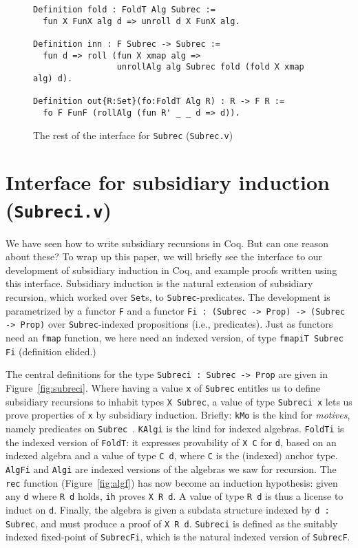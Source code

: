 \documentclass[a4paper,USenglish]{lipics-v2021}
\begin{document}
\begin{figure}
\begin{verbatim}
Definition fold : FoldT Alg Subrec :=
  fun X FunX alg d => unroll d X FunX alg.

Definition inn : F Subrec -> Subrec :=
  fun d => roll (fun X xmap alg =>
                 unrollAlg alg Subrec fold (fold X xmap alg) d).

Definition out{R:Set}(fo:FoldT Alg R) : R -> F R :=
  fo F FunF (rollAlg (fun R' _ _ d => d)).
\end{verbatim}
\caption{The rest of the interface for \texttt{Subrec} (\texttt{Subrec.v})}
\label{fig:subrecb}
\end{figure}


\section{Interface for subsidiary induction (\texttt{Subreci.v})}
\label{sec:interfacei}

We have seen how to write subsidiary recursions in Coq.  But can one
reason about these?  To wrap up this paper, we will briefly see the
interface to our development of subsidiary induction in Coq, and
example proofs written using this interface.  Subsidiary induction is
the natural extension of subsidiary recursion, which worked over
\verb|Set|s, to \verb|Subrec|-predicates.  The development is
parametrized by a functor \verb|F| and a functor
\verb|Fi : (Subrec -> Prop) -> (Subrec -> Prop)| over
\verb|Subrec|-indexed propositions (i.e., predicates).  Just as
functors need an \verb|fmap| function, we here need an indexed
version, of type \verb|fmapiT Subrec Fi| (definition elided.)

The central definitions for the type \verb|Subreci : Subrec -> Prop|
are given in Figure~\ref{fig:subreci}.  Where having a value \verb|x|
of \verb|Subrec| entitles us to define subsidiary recursions to
inhabit types \verb|X Subrec|, a value of type \verb|Subreci x| lets
us prove properties of \verb|x| by subsidiary induction.  Briefly:
\verb|kMo| is the kind for \emph{motives}, namely predicates on
\verb|Subrec|~\cite{mcbride00}.  \verb|KAlgi| is the kind for indexed
algebras.  \verb|FoldTi| is the indexed version of \verb|FoldT|: it
expresses provability of \verb|X C| for \verb|d|, based on an indexed
algebra and a value of type \verb|C d|, where \verb|C| is the (indexed) anchor
type.  \verb|AlgFi| and \verb|Algi| are indexed versions
of the algebras we saw for recursion.  The \verb|rec| function
(Figure~\ref{fig:algf}) has now become an induction hypothesis: given
any \verb|d| where \verb|R d| holds, \verb|ih| proves \verb|X R d|.  A
value of type \verb|R d| is thus a license to induct on \verb|d|.
Finally, the algebra is given a subdata structure indexed by
\verb|d : Subrec|, and must produce a proof of \verb|X R d|.  \verb|Subreci|
is defined as the suitably indexed fixed-point of \verb|SubrecFi|, which
is the natural indexed version of \verb|SubrecF|.
\end{document}
